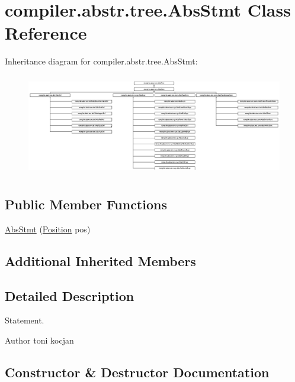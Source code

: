 \hypertarget{classcompiler_1_1abstr_1_1tree_1_1_abs_stmt}{}\section{compiler.\+abstr.\+tree.\+Abs\+Stmt Class Reference}
\label{classcompiler_1_1abstr_1_1tree_1_1_abs_stmt}
Inheritance diagram for compiler.\+abstr.\+tree.\+Abs\+Stmt\+:\begin{figure}[H]
\begin{center}
\leavevmode
\includegraphics[height=4.472843cm]{classcompiler_1_1abstr_1_1tree_1_1_abs_stmt}
\end{center}
\end{figure}
\subsection*{Public Member Functions}
\begin{DoxyCompactItemize}
\item 
\hyperlink{classcompiler_1_1abstr_1_1tree_1_1_abs_stmt_a2e37c113e5c0d2febd88c952a15dcbee}{Abs\+Stmt} (\hyperlink{classcompiler_1_1_position}{Position} pos)
\end{DoxyCompactItemize}
\subsection*{Additional Inherited Members}


\subsection{Detailed Description}
Statement. \begin{DoxyAuthor}{Author}
toni kocjan 
\end{DoxyAuthor}


\subsection{Constructor \& Destructor Documentation}
\mbox{\label{classcompiler_1_1abstr_1_1tree_1_1_abs_stmt_a2e37c113e5c0d2febd88c952a15dcbee}} 
